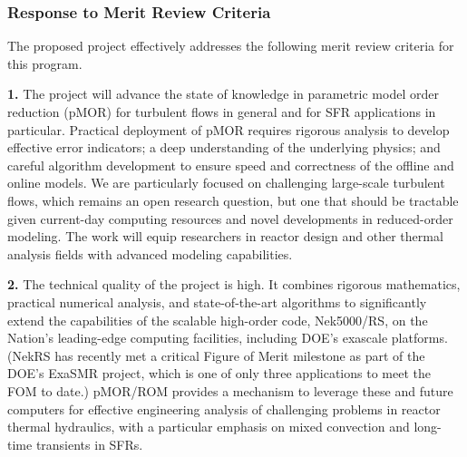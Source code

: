 




\subsubsection*{Response to Merit Review Criteria}
The proposed project effectively addresses the following merit review
criteria for this program.

\noindent \textbf{1.}
  The project will advance the state of knowledge in parametric model order
reduction (pMOR) for turbulent flows in general and for SFR applications in
particular.  Practical deployment of pMOR requires rigorous analysis to develop
effective error indicators; a deep understanding of the underlying physics; and
careful algorithm development to ensure speed and correctness of the offline
and online models.  We are particularly focused on challenging large-scale
turbulent flows, which remains an open research question, but one that should
be tractable given current-day computing resources and novel developments in
reduced-order modeling.  The work will equip researchers in reactor design and
other thermal analysis fields with advanced modeling capabilities.

\noindent \textbf{2.}
The technical quality of the project is high.  It combines rigorous
mathematics, practical numerical analysis, and state-of-the-art algorithms to
significantly extend the capabilities of the scalable high-order code,
Nek5000/RS, on the Nation's leading-edge computing facilities, including DOE's
exascale platforms. (NekRS has recently met a critical Figure of Merit
milestone as part of the DOE's ExaSMR project, which is one of only three
applications to meet the FOM to date.)  pMOR/ROM provides a mechanism to
leverage these and future computers for effective engineering analysis of
challenging problems in reactor thermal hydraulics, with a particular 
emphasis on mixed convection and long-time transients in SFRs.


